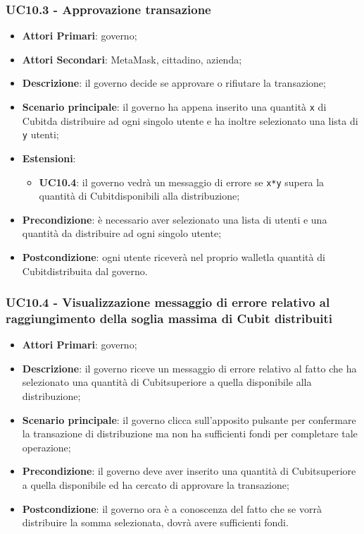 \subsubsection{UC10.3 - Approvazione transazione}
\begin{itemize}
	\item \textbf{Attori Primari}: governo;
	\item \textbf{Attori Secondari}: MetaMask\glo, cittadino, azienda\glo;
	\item \textbf{Descrizione}: il governo decide se approvare o rifiutare la transazione;
	\item \textbf{Scenario principale}: il governo ha appena inserito una quantità \texttt{x} di Cubit\glosp da distribuire ad ogni singolo utente e ha inoltre selezionato una lista di \texttt{y} utenti;
	\item \textbf{Estensioni}:
	\begin{itemize}
		\item \textbf{UC10.4}: il governo vedrà un messaggio di errore se \texttt{x*y} supera la quantità di Cubit\glosp disponibili alla distribuzione;
	\end{itemize}
	\item \textbf{Precondizione}: è necessario aver selezionato una lista di utenti e una quantità da distribuire ad ogni singolo utente;
	\item \textbf{Postcondizione}: ogni utente riceverà nel proprio wallet\glosp la quantità di Cubit\glosp distribuita dal governo.
\end{itemize}
\subsubsection{UC10.4 - Visualizzazione messaggio di errore relativo al raggiungimento della soglia massima di Cubit distribuiti}
\begin{itemize}
	\item \textbf{Attori Primari}: governo;
	\item \textbf{Descrizione}: il governo riceve un messaggio di errore relativo al fatto che ha selezionato una quantità di Cubit\glosp superiore a quella disponibile alla distribuzione;
	\item \textbf{Scenario principale}: il governo clicca sull'apposito pulsante per confermare la transazione di distribuzione ma non ha sufficienti fondi per completare tale operazione;
	\item \textbf{Precondizione}: il governo deve aver inserito una quantità di Cubit\glosp superiore a quella disponibile ed ha cercato di approvare la transazione;
	\item \textbf{Postcondizione}: il governo ora è a conoscenza del fatto che se vorrà distribuire la somma selezionata, dovrà avere sufficienti fondi.
	
\end{itemize} 
